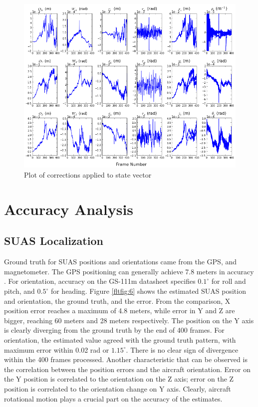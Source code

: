 \begin{figure}[h]
\centering
\includegraphics[width=15cm, keepaspectratio=true]
{./Figures/fltfig/cut1/Figure112.png}
\caption{Plot of corrections applied to state vector}
\label{fltfig:4}
\end{figure}
\FloatBarrier

\section{Accuracy Analysis}\label{sec:flight-accuracy}
\subsection{SUAS Localization}

Ground truth for SUAS positions and orientations came from the GPS,
and magnetometer. The GPS positioning can generally achieve 7.8 meters
in accuracy \cite{_gps_????}. For orientation, accuracy on the GS-111m
datasheet specifies $0.1^{\circ}$ for roll and pitch, and
$0.5^{\circ}$ for heading. Figure \ref{fltfig:6} shows the estimated
SUAS position and orientation, the ground truth, and the error. From the
comparison, X position error reaches a maximum of 4.8 meters, while
error in Y and Z are bigger, reaching 60 meters and 28 meters
respectively. The position on the Y axis is clearly diverging from the
ground truth by the end of 400 frames. For orientation, the estimated
value agreed with the ground truth pattern, with maximum error within
0.02 rad or $1.15^{\circ}$. There is no clear sign of divergence
within the 400 frames processed. Another characteristic that can be
observed is the correlation between the position errors and the
aircraft orientation. Error on the Y position is correlated to the
orientation on the Z axis; error on the Z position is correlated to the
orientation change on Y axis. Clearly, aircraft rotational motion
plays a crucial part on the accuracy of the estimates.

